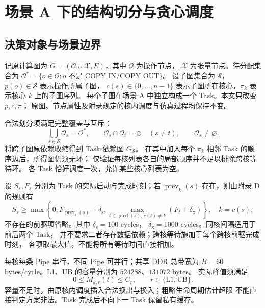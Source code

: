 \section{场景 A 下的结构切分与贪心调度}
\subsection{决策对象与场景边界}
记原计算图为 $G=(\mathcal O\cup\mathcal X,E)$，其中 $\mathcal O$ 为操作节点，
$\mathcal X$ 为张量节点。待分配集合为
$\mathcal O^*=\{o\in\mathcal O:o\text{ 不是 COPY\_IN/COPY\_OUT}\}$。
设子图集合为 $\mathcal S$，$p(o)\in\mathcal S$ 表示操作所属子图，
$c(s)\in\{0,\ldots,n-1\}$ 表示子图所在核心，$\pi_k$ 表示核心 $k$ 上的子图序列。
每个子图在场景 A 中独立构成一个 Task。本文只改变 $p,c,\pi$；
原图、节点属性及附录规定的核内调度与仿真过程均保持不变。

合法划分须满足完整覆盖与互斥：
\begin{equation}
 \bigcup_{s\in\mathcal S}\mathcal O_s=\mathcal O^*,\qquad
 \mathcal O_s\cap\mathcal O_t=\varnothing\quad(s\ne t),\qquad
 \mathcal O_s\ne\varnothing .
 \label{eq:q1-cover}
\end{equation}
将跨子图原依赖收缩得到 Task 依赖图 $G_{\mathcal S}$。
在其中加入每个 $\pi_k$ 相邻 Task 的顺序边后，所得图仍须无环；
仅验证每核列表各自的局部顺序并不足以排除跨核等待环。
各 Task 恰好调度一次，允许某些核心列表为空。

设 $S_s,F_s$ 分别为 Task 的实际启动与完成时刻；若 $\operatorname{prev}_k(s)$
存在，则由附录 D 的规则有
\begin{equation}
 S_s\ge\max\left\{0,
 F_{\operatorname{prev}_k(s)}+\delta_{\mathrm{s}},
 \max_{t\in\operatorname{pred}(s),\,c(t)\ne k}(F_t+\delta_{\mathrm{x}})
 \right\},\quad k=c(s),
 \label{eq:q1-release}
\end{equation}
不存在的前驱项省略。其中 $\delta_{\mathrm{s}}=100$ cycles，
$\delta_{\mathrm{x}}=1000$ cycles。同核间隔适用于前后两个 Task，
并不要求二者存在数据依赖；跨核等待施加于每个跨核前驱完成时刻，
各项取最大值，不能将所有等待时间直接相加。

每核每条 Pipe 串行，不同 Pipe 可并行；共享 DDR 总带宽为
$B=60$ bytes/cycle。L1、UB 的容量分别为 $524288$、$131072$ bytes。
实际峰值须满足
\begin{equation}
 0\le M_{k,r}(t)\le C_r,\qquad r\in\{\mathrm{L1},\mathrm{UB}\}.
 \label{eq:q1-memory}
\end{equation}
容量不足时，由原核内调度插入合法换出与换入；粗略生命周期估计超限
不能直接判定方案非法。Task 完成后不向下一 Task 保留私有缓存。

